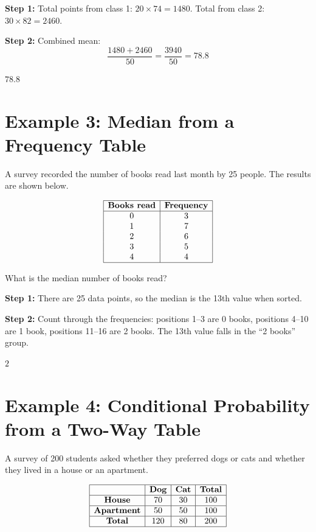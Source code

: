 \documentclass[14pt]{extarticle}
\begin{document}
\textbf{Step 1:} Total points from class 1: \(20 \times 74 = 1480\). Total from class 2: \(30 \times 82 = 2460\).

\textbf{Step 2:} Combined mean:
\[
\frac{1480 + 2460}{50} = \frac{3940}{50} = 78.8
\]

\(\boxed{78.8}\)

\section*{Example 3: Median from a Frequency Table}

A survey recorded the number of books read last month by 25 people. The results are shown below.

\[
\begin{array}{|c|c|}
\hline
\textbf{Books read} & \textbf{Frequency} \\
\hline
0 & 3 \\
1 & 7 \\
2 & 6 \\
3 & 5 \\
4 & 4 \\
\hline
\end{array}
\]

What is the median number of books read?

\textbf{Step 1:} There are 25 data points, so the median is the 13th value when sorted.

\textbf{Step 2:} Count through the frequencies: positions 1--3 are 0 books, positions 4--10 are 1 book, positions 11--16 are 2 books. The 13th value falls in the ``2 books'' group.

\(\boxed{2}\)

\section*{Example 4: Conditional Probability from a Two-Way Table}

A survey of 200 students asked whether they preferred dogs or cats and whether they lived in a house or an apartment.

\[
\begin{array}{|c|c|c|c|}
\hline
 & \textbf{Dog} & \textbf{Cat} & \textbf{Total} \\
\hline
\textbf{House} & 70 & 30 & 100 \\
\hline
\textbf{Apartment} & 50 & 50 & 100 \\
\hline
\textbf{Total} & 120 & 80 & 200 \\
\hline
\end{array}
\]
\end{document}
